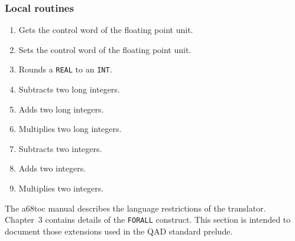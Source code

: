 \subsubsection*{Local routines}
\begin{enumerate}
\item {}\newline
Gets the control word of the floating point unit.
\item {}\newline
Sets the control word of the floating point unit.
\item {}\newline
Rounds a \verb|REAL| to an \verb|INT|.
\item {}\newline
Subtracts two long integers.
\item {}\newline
Adds two long integers.
\item {}\newline
Multiplies two long integers.
\item {}\newline
Subtracts two integers.
\item {}\newline
Adds two integers.
\item {}\newline
Multiplies two integers.
\end{enumerate}

The a68toc manual describes the language restrictions of the
translator. Chapter~3 contains details of the \verb|FORALL|
construct.  This section is intended to document those extensions
used in the QAD standard prelude.

